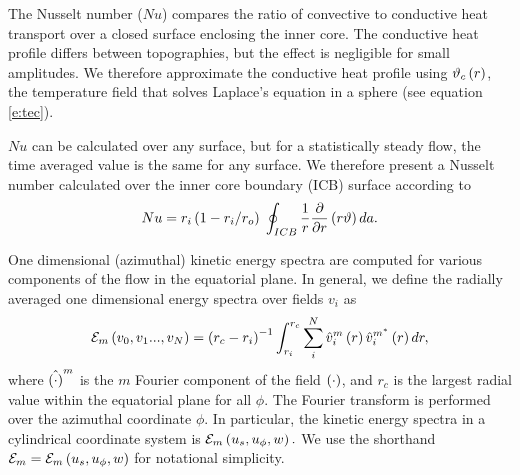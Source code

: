 The Nusselt number ($Nu$) compares the ratio of convective to conductive heat transport over a closed surface enclosing the inner core. 
The conductive heat profile differs between topographies, but the effect is negligible for small amplitudes. We therefore approximate the conductive heat profile using $\vartheta_c\left ( r\right )$, the temperature field that solves Laplace's equation in a sphere (see equation \eqref{e:tec}).


 $Nu $ can be calculated over any surface, but for a statistically steady flow, the time averaged value is the same for any surface. 
We therefore present a Nusselt number calculated over the inner core boundary (ICB) surface according to
\[Nu = r_{i}\left ( 1-r_{i}/r_{o}\right )\;\oint_{ICB}\frac{1}{r} \frac{\partial }{\partial r} \left ( r\vartheta\right ) da .\]


One dimensional (azimuthal) kinetic energy spectra are computed for various components of the flow in the equatorial plane. 
In general, we define the radially averaged one dimensional energy spectra over fields $v_{i}$ as
\begin{equation}
	\mathcal{E}_{m}\left ( v_{0},v_{1}...,v_{N}\right ) = \left ( r_c -r_{i}\right ) ^{-1} 
	\int_{r_i}^{r_{c}} \sum_{i}^{N}\hat{v}_{i}^{m}\left ( r\right ) \hat{v}_{i}^{m^*}\left ( r\right )  d r ,
\label{e:spectra_def}
\end{equation}
where $\hat{\left (\cdot\right )}^{m} $ is the $m$ Fourier component of the field $\left ( \cdot\right ) $, and $r_c$ is the largest radial value within the equatorial plane for all $\phi$.    
The Fourier transform is performed over the azimuthal coordinate $\phi$. 
In particular, the kinetic energy spectra in a cylindrical coordinate system is $\mathcal{E}_{m} \left ( u_{s},u_{\phi},w\right ).$  
We use the shorthand $\mathcal{E}_{m}=\mathcal{E}_{m}\left (  u_{s},u_{\phi},w\right ) $ for notational simplicity. 

